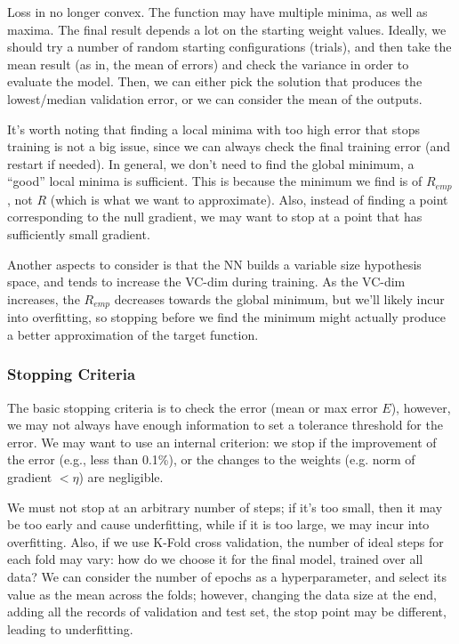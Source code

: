 Loss in no longer convex. The function may have multiple minima, as well as maxima. The final result depends a lot on the starting weight values. Ideally, we should try a number of random starting configurations (trials), and then take the mean result (as in, the mean of errors) and check the variance in order to evaluate the model. Then, we can either pick the solution that produces the lowest/median validation error, or we can consider the mean of the outputs.

It's worth noting that finding a local minima with too high error that stops training is not a big issue, since we can always check the final training error (and restart if needed). In general, we don't need to find the global minimum, a ``good'' local minima is sufficient. This is because the minimum we find is of $R_{emp}$, not $R$ (which is what we want to approximate). Also, instead of finding a point corresponding to the null gradient, we may want to stop at a point that has sufficiently small gradient.

Another aspects to consider is that the NN builds a variable size hypothesis space, and tends to increase the VC-dim during training. As the VC-dim increases, the $R_{emp}$ decreases towards the global minimum, but we'll likely incur into overfitting, so stopping before we find the minimum might actually produce a better approximation of the target function.

\subsubsection{Stopping Criteria}

The basic stopping criteria is to check the error (mean or max error $ E$), however, we may not always have enough information to set a tolerance threshold for the error. We may want to use an internal criterion: we stop if the improvement of the error (e.g., less than 0.1\%), or the changes to the weights (e.g. norm of gradient $ < \eta$) are negligible.

We must not stop at an arbitrary number of steps; if it's too small, then it may be too early and cause underfitting, while if it is too large, we may incur into overfitting. Also, if we use K-Fold cross validation, the number of ideal steps for each fold may vary: how do we choose it for the final model, trained over all data? We can consider the number of epochs as a hyperparameter, and select its value as the mean across the folds; however, changing the data size at the end, adding all the records of validation and test set, the stop point may be different, leading to underfitting.

